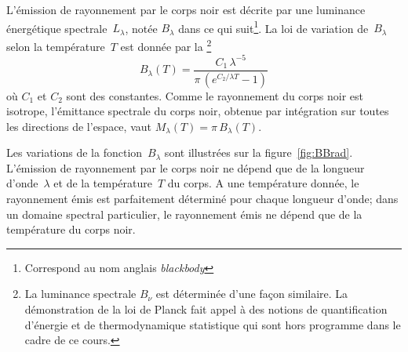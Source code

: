 \sk
L'émission de rayonnement par le corps noir est décrite par une luminance énergétique spectrale~$L_{\lambda}$, notée $B_\lambda$ dans ce qui suit\footnote{Correspond au nom anglais \emph{blackbody}}. La loi de variation de~$B_\lambda$ selon la température~$T$ est donnée par la \footnote{La luminance spectrale $B_\nu$ est déterminée d'une façon similaire. La démonstration de la loi de Planck fait appel à des notions de quantification d'énergie et de thermodynamique statistique qui sont hors programme dans le cadre de ce cours.} $$ B_\lambda(T) = \frac{C_1 \, \lambda^{-5}}{\pi \, \left( e^{ C_2 / \lambda T}-1\right) } $$ où $C_1$ et $C_2$ sont des constantes. Comme le rayonnement du corps noir est isotrope, l'émittance spectrale du corps noir, obtenue par intégration sur toutes les directions de l'espace, vaut $ M_\lambda(T) = \pi \, B_\lambda(T) $. 


\sk
Les variations de la fonction~$B_\lambda$ sont illustrées sur la figure~\ref{fig:BBrad}. L'émission de rayonnement par le corps noir ne dépend que de la longueur d'onde~$\lambda$ et de la température~$T$ du corps. A une température donnée, le rayonnement émis est parfaitement déterminé pour chaque longueur d'onde; dans un domaine spectral particulier, le rayonnement émis ne dépend que de la température du corps noir.

